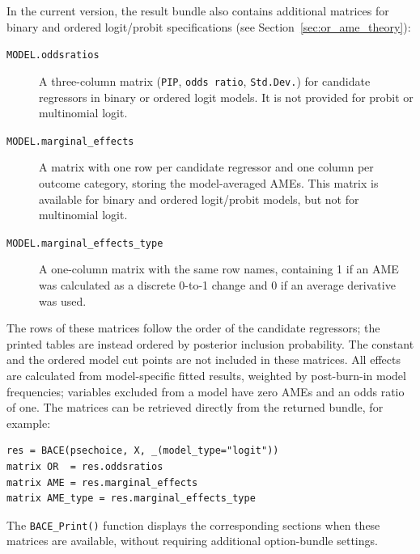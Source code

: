 In the current version, the result bundle also contains
additional matrices for binary and ordered logit/probit
specifications (see Section~\ref{sec:or_ame_theory}):
\begin{description}
  \item[\texttt{MODEL.oddsratios}] A three-column matrix
    (\texttt{PIP}, \texttt{odds ratio}, \texttt{Std.Dev.})
    for candidate regressors in binary or ordered logit models.
    It is not provided for probit or multinomial logit.
  \item[\texttt{MODEL.marginal\_effects}] A matrix with one
    row per candidate regressor and one column per outcome
    category, storing the model-averaged AMEs. This matrix
    is available for binary and ordered logit/probit models,
    but not for multinomial logit.
  \item[\texttt{MODEL.marginal\_effects\_type}] A one-column
    matrix with the same row names, containing 1 if an AME
    was calculated as a discrete 0-to-1 change and 0 if
    an average derivative was used.
\end{description}
The rows of these matrices follow the order of the candidate
regressors; the printed tables are instead ordered by
posterior inclusion probability. The constant and the ordered
model cut points are not included in these matrices.
All effects are calculated from model-specific fitted results,
weighted by post-burn-in \MCcube model frequencies; variables
excluded from a model have zero AMEs and an odds ratio of one.
The matrices can be retrieved directly from the returned
bundle, for example:
\begin{lstlisting}
res = BACE(psechoice, X, _(model_type="logit"))
matrix OR  = res.oddsratios
matrix AME = res.marginal_effects
matrix AME_type = res.marginal_effects_type
\end{lstlisting}
The \texttt{BACE\_Print()} function displays the corresponding
sections when these matrices are available, without requiring
additional option-bundle settings.


